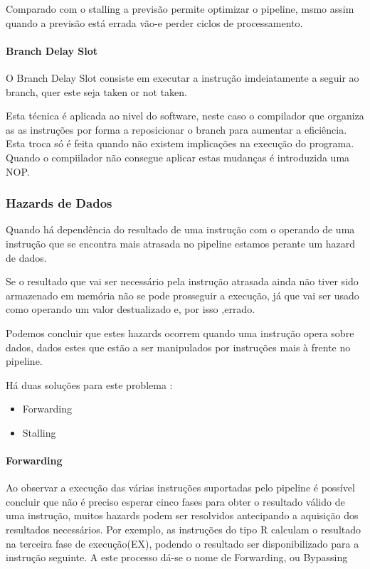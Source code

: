 \documentclass[10pt,a4paper]{book}
\begin{document}
				Comparado com o stalling a previsão permite optimizar o pipeline, msmo assim quando a previsão está errada vão-e perder ciclos de processamento.


      \paragraph{Branch Delay Slot}

				O Branch Delay Slot consiste em executar a instrução imdeiatamente a seguir ao branch, quer este seja taken or not taken.

        Esta técnica é aplicada ao nivel do software, neste caso o compilador que organiza as as instruções por forma a reposicionar o branch para aumentar a eficiência. Esta troca só é feita quando não existem implicações na execução do programa. Quando o compiilador não consegue aplicar estas mudanças é introduzida uma NOP.


		\subsubsection{Hazards de Dados}

		Quando há dependência do resultado de uma instrução com o operando de uma instrução que se encontra mais atrasada no pipeline estamos perante um hazard de dados.


		Se o resultado que vai ser necessário pela instrução atrasada ainda não tiver sido armazenado em memória não se pode prosseguir a execução, já que vai ser usado como operando um valor destualizado e, por isso ,errado.

		Podemos concluir que estes hazards ocorrem quando uma instrução  opera sobre dados, dados estes que estão a ser manipulados por instruções mais à frente no pipeline.

		Há duas soluções para este problema :
		 \begin{itemize}
			 \item Forwarding
			 \item Stalling
	 \end{itemize}


	 \paragraph{Forwarding}

	 Ao observar a execução das várias instruções suportadas pelo pipeline é possível concluir que não é preciso esperar cinco fases para obter o resultado válido de uma instrução, muitos hazards podem ser resolvidos antecipando a aquisição dos resultados necessários. Por exemplo, as instruções do tipo R calculam o resultado na terceira fase de execução(EX), podendo o resultado ser disponibilizado para a instrução seguinte. A este processo dá-se o nome de Forwarding, ou Bypassing
\end{document}
